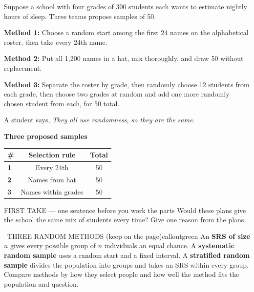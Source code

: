 \documentclass[11pt]{article}
\begin{document}


Suppose a school with four grades of 300 students each wants to estimate nightly hours of sleep. Three teams propose samples of 50.\par\smallskip \textbf{Method 1:} Choose a random start among the first 24 names on the alphabetical roster, then take every 24th name.\par \textbf{Method 2:} Put all 1{,}200 names in a hat, mix thoroughly, and draw 50 without replacement.\par \textbf{Method 3:} Separate the roster by grade, then randomly choose 12 students from each grade, then choose two grades at random and add one more randomly chosen student from each, for 50 total.\par\smallskip A student says, \emph{They all use randomness, so they are the same.}\par
\begin{center}
\textbf{Three proposed samples}\par\smallskip
\begin{tabular}{|l|c|c|}
\hline
\textbf{\#} & \textbf{Selection rule} & \textbf{Total} \\ \hline
\textbf{1} & Every 24th & 50 \\ \hline
\textbf{2} & Names from hat & 50 \\ \hline
\textbf{3} & Names within grades & 50 \\ \hline
\end{tabular}
\end{center}
\begin{firsttakebox}{FIRST TAKE --- one sentence before you work the parts}
Would these plans give the school the same mix of students every time? Give one reason from the plans.
\workspace{0.9in}
\end{firsttakebox}

\begin{callout}{\IconBook\ THREE RANDOM METHODS (keep on the page)}{calloutgreen}
An \textbf{SRS of size $n$} gives every possible group of $n$ individuals an equal chance. A \textbf{systematic random sample} uses a random start and a fixed interval. A \textbf{stratified random sample} divides the population into groups and takes an SRS within every group. Compare methods by how they select people and how well the method fits the population and question.
\end{callout}
\end{document}
